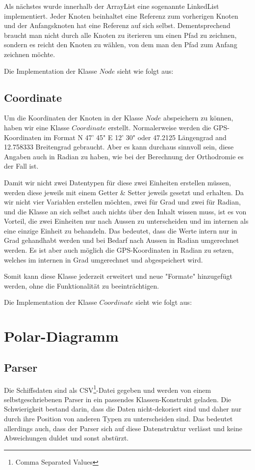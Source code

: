 Als nächstes wurde innerhalb der ArrayList eine sogenannte LinkedList
implementiert. Jeder Knoten beinhaltet eine Referenz zum vorherigen Knoten und
der Anfangsknoten hat eine Referenz auf sich selbst. Dementsprechend braucht
man nicht durch alle Knoten zu iterieren um einen Pfad zu zeichnen, sondern es
reicht den Knoten zu wählen, von dem man den Pfad zum Anfang zeichnen möchte.

Die Implementation der Klasse $Node$ sieht wie folgt aus:



\subsection{Coordinate}
Um die Koordinaten der Knoten in der Klasse $Node$ abspeichern zu können,
haben wir eine Klasse $Coordinate$ erstellt. Normalerweise werden die
GPS-Koordinaten im Format N 47' 45" E 12' 30" oder 47.2125
Längengrad and 12.758333 Breitengrad gebraucht. Aber es kann durchaus sinnvoll
sein, diese Angaben auch in Radian zu haben, wie bei der Berechnung der
Orthodromie es der Fall ist. 

Damit wir nicht zwei Datentypen für diese zwei Einheiten erstellen müssen,
werden diese jeweils mit einem Getter \& Setter jeweils gesetzt und erhalten.
Da wir nicht vier Variablen erstellen möchten, zwei für Grad und zwei für
Radian, und die Klasse an sich selbst auch nichts über den Inhalt wissen muss,
ist es von Vorteil, die zwei Einheiten nur nach Aussen zu unterscheiden und im
internen als eine einzige Einheit zu behandeln. Das bedeutet, dass die Werte
intern nur in Grad gehandhabt werden und bei Bedarf nach Aussen in Radian
umgerechnet werden. Es ist aber auch möglich die GPS-Koordinaten in Radian zu
setzen, welches im internen in Grad umgerechnet und abgespeichert wird. 

Somit kann diese Klasse jederzeit erweitert und neue "Formate" hinzugefügt
werden, ohne die Funktionalität zu beeinträchtigen.

Die Implementation der Klasse $Coordinate$ sieht wie folgt aus:



\section{Polar-Diagramm}
\subsection{Parser}
Die Schiffsdaten sind als CSV\footnote{Comma Separated Values}-Datei gegeben
und werden von einem selbst\-geschriebenen Parser in ein passendes
Klassen-Konstrukt geladen. Die Schwierigkeit bestand darin, dass die Daten
nicht-dekoriert sind und daher nur durch ihre Position von anderen Typen zu
unterscheiden sind. Das bedeutet allerdings auch, dass der Parser sich auf
diese Datenstruktur verlässt und keine Abweichungen duldet und sonst abstürzt.

